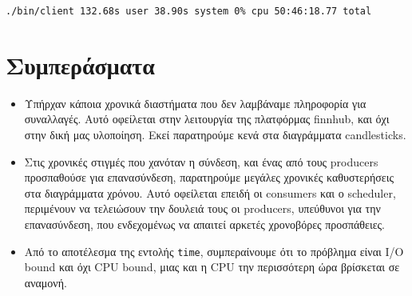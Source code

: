 \documentclass[12pt, a4paper]{article}
\begin{document}
\verb|./bin/client 132.68s user 38.90s system 0% cpu 50:46:18.77 total|


\section{Συμπεράσματα}

\begin{itemize}
\itemsep 0em
\item Υπήρχαν κάποια χρονικά διαστήματα που δεν λαμβάναμε πληροφορία για συναλλαγές. Αυτό οφείλεται στην λειτουργία της πλατφόρμας finnhub, και όχι στην δική μας υλοποίηση. Εκεί παρατηρούμε κενά στα διαγράμματα candlesticks.
\item Στις χρονικές στιγμές που χανόταν η σύνδεση, και ένας από τους producers προσπαθούσε για επανασύνδεση, παρατηρούμε μεγάλες χρονικές καθυστερήσεις στα διαγράμματα χρόνου. Αυτό οφείλεται επειδή οι consumers και ο scheduler, περιμένουν να τελειώσουν την δουλειά τους οι producers, υπεύθυνοι για την επανασύνδεση, που ενδεχομένως να απαιτεί αρκετές χρονοβόρες προσπάθειες.
\item Από το αποτέλεσμα της εντολής \verb|time|, συμπεραίνουμε ότι το πρόβλημα είναι I/O bound και όχι CPU bound, μιας και η CPU την περισσότερη ώρα βρίσκεται σε αναμονή.
\end{itemize}
\end{document}
